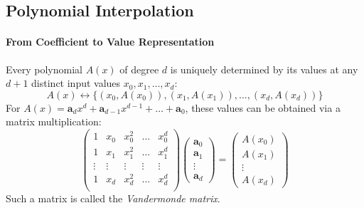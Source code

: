\subsection{Polynomial Interpolation}
\paragraph{From Coefficient to Value Representation}
Every polynomial \(A(x)\) of degree \(d\) is uniquely determined by its values at any 
\(d+1\) distinct input values \(x_0, x_1, \dots, x_d\):
\[A(x) \leftrightarrow \{(x_0, A(x_0)), (x_1, A(x_1)), \dots, (x_d, A(x_d))\}\]
For \(A(x) = \boldsymbol{a}_d x^d + \boldsymbol{a}_{d-1}x^{d-1}+ \dots + \boldsymbol{a}_0\),
these values can be obtained via a matrix multiplication:
\[
\begin{pmatrix}
1 & x_0 & x_0^2 & \dots & x_0^d\\
1 & x_1 & x_1^2 & \dots & x_1^d\\
\vdots & \vdots & \vdots & \vdots & \vdots\\
1 & x_d & x_d^2 & \dots & x_d^d\\
\end{pmatrix}
\begin{pmatrix}
\boldsymbol{a}_0 \\
\boldsymbol{a}_1 \\
\vdots \\
\boldsymbol{a}_d
\end{pmatrix}
=
\begin{pmatrix}
A(x_0) \\
A(x_1) \\
\vdots \\
A(x_d)
\end{pmatrix}
\]
Such a matrix is called the \textit{Vandermonde matrix}.

